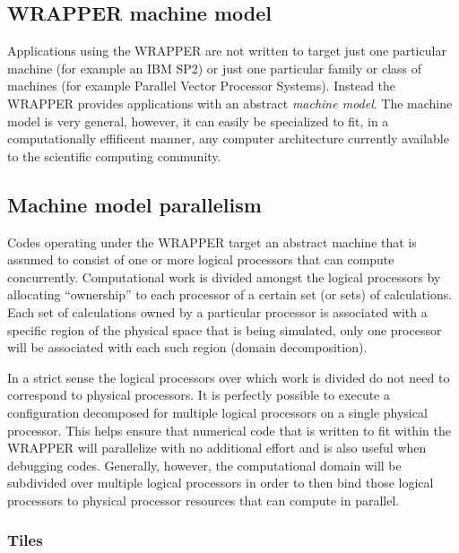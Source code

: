 \subsection{WRAPPER machine model}

Applications using the WRAPPER are not written to target just one 
particular machine (for example an IBM SP2) or just one particular family or 
class of machines (for example Parallel Vector Processor Systems). Instead the
WRAPPER provides applications with an 
abstract {\it machine model}. The machine model is very general, however, it can
easily be specialized to fit, in a computationally effificent manner, any 
computer architecture currently available to the scientific computing community.

\subsection{Machine model parallelism}

 Codes operating under the WRAPPER target an abstract machine that is assumed to
consist of one or more logical processors that can compute concurrently.  
Computational work is divided amongst the logical
processors by allocating ``ownership'' to 
each processor of a certain set (or sets) of calculations. Each set of 
calculations owned by a particular processor is associated with a specific 
region of the physical space that is being simulated, only one processor will 
be associated with each such region (domain decomposition).  

In a strict sense the logical processors over which work is divided do not need 
to correspond to physical processors. It is perfectly possible to execute a 
configuration decomposed for multiple logical processors on a single physical 
processor. This helps ensure that numerical code that is written to fit
within the WRAPPER will parallelize with no additional effort and is
also useful when debugging codes. Generally, however,
the computational domain will be subdivided over multiple logical
processors in order to then bind those logical processors to physical 
processor resources that can compute in parallel.

\subsubsection{Tiles}


